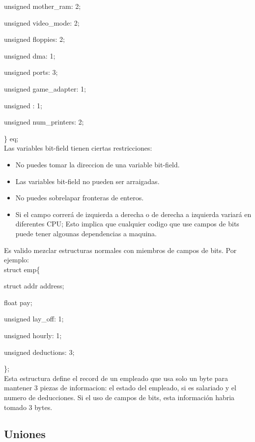 \documentclass[]{article}
\begin{document}
			unsigned mother\_ram: 2;
			
			unsigned video\_mode: 2;
			
			unsigned floppies: 2;
			
			unsigned dma: 1;
			
			unsigned ports: 3;
			
			unsigned game\_adapter: 1;
			
			unsigned : 1;
			
			unsigned num\_printers: 2;
			
			\} eq;\\
			
			Las variables bit-field tienen ciertas restricciones:
			
			\begin{itemize}
				\item No puedes tomar la direccion de una variable bit-field.
				\item Las variables bit-field no pueden ser arraigadas.
				\item No puedes sobrelapar fronteras de enteros.
				\item Si el campo correrá de izquierda a derecha o de derecha a izquierda variará en diferentes CPU; Esto implica que cualquier codigo que use campos de bits puede tener algounas dependencias a maquina.
			\end{itemize}
		
			Es valido mezclar estructuras normales con miembros de campos de bits. Por ejemplo:\\
			
			struct emp\{
			
			struct addr address;
			
			float pay;
			
			unsigned lay\_off: 1;
			
			unsigned hourly: 1;
			
			unsigned deductions: 3;
			
			\};\\
			
			Esta estructura define el record de un empleado que usa solo un byte para mantener 3 piezas de informacion: el estado del empleado, si es salariado y el numero de deducciones. Si el uso de campos de bits, esta información habria tomado 3 bytes.
			
			\subsection{Uniones}
			
\end{document}
